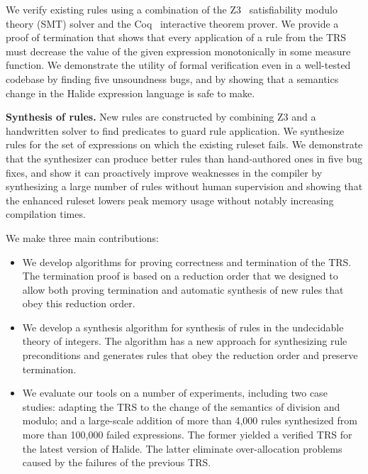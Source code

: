 \documentclass[acmsmall,review,anonymous]{acmart}\settopmatter{printfolios=true,printccs=false,printacmref=false}
\begin{document}


We verify existing rules using a combination of the Z3~\cite{de2008z3}
satisfiability modulo theory (SMT) solver and the Coq~\cite{coq19} interactive
theorem prover. We provide a proof of termination that shows that every application of a rule from the TRS must decrease the value of the given expression monotonically in some measure function. We demonstrate the utility of formal verification even in a well-tested codebase by finding five unsoundness bugs, and by showing that a semantics change in the Halide expression language is safe to make.

\textbf{Synthesis of rules.} New rules are constructed by combining Z3 and a
handwritten solver to find predicates to guard rule application. We 
synthesize rules for the set of expressions on which the 
existing ruleset fails. We demonstrate that the synthesizer can produce better rules than hand-authored ones in five bug fixes, and show it can proactively improve weaknesses in the compiler by synthesizing a large number of rules without human supervision and showing that the enhanced ruleset lowers peak memory usage without notably increasing compilation times.

We make three main contributions:
\begin{itemize}
  \item We develop algorithms for proving correctness and termination of the TRS. The termination proof is based on a reduction order that we designed to allow both proving termination and automatic synthesis of new rules that obey this reduction order. 
  \item We develop a synthesis algorithm for synthesis of rules in the undecidable theory of integers. 
  The algorithm has a new approach for synthesizing rule preconditions and generates rules that obey the reduction order and preserve termination.

  \item{We evaluate our tools on a number of experiments, including two case studies: adapting the TRS to the change of the semantics of division and modulo; and a large-scale addition of more than 4,000 rules synthesized from more than 100,000 failed expressions. The former yielded a verified TRS for the latest version of Halide.  The latter eliminate over-allocation problems caused by the failures of the previous TRS.}
\end{itemize}
\end{document}
